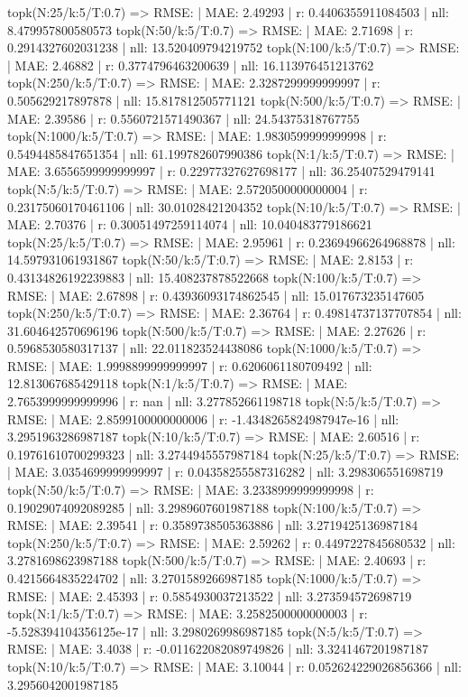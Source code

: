 topk(N:25/k:5/T:0.7) => RMSE: | MAE: 2.49293 | r: 0.4406355911084503 | nll: 8.479957800580573
topk(N:50/k:5/T:0.7) => RMSE: | MAE: 2.71698 | r: 0.2914327602031238 | nll: 13.520409794219752
topk(N:100/k:5/T:0.7) => RMSE: | MAE: 2.46882 | r: 0.3774796463200639 | nll: 16.113976451213762
topk(N:250/k:5/T:0.7) => RMSE: | MAE: 2.3287299999999997 | r: 0.505629217897878 | nll: 15.817812505771121
topk(N:500/k:5/T:0.7) => RMSE: | MAE: 2.39586 | r: 0.5560721571490367 | nll: 24.54375318767755
topk(N:1000/k:5/T:0.7) => RMSE: | MAE: 1.9830599999999998 | r: 0.5494485847651354 | nll: 61.199782607990386
topk(N:1/k:5/T:0.7) => RMSE: | MAE: 3.6556599999999997 | r: 0.22977327627698177 | nll: 36.25407529479141
topk(N:5/k:5/T:0.7) => RMSE: | MAE: 2.5720500000000004 | r: 0.23175060170461106 | nll: 30.01028421204352
topk(N:10/k:5/T:0.7) => RMSE: | MAE: 2.70376 | r: 0.30051497259114074 | nll: 10.040483779186621
topk(N:25/k:5/T:0.7) => RMSE: | MAE: 2.95961 | r: 0.23694966264968878 | nll: 14.597931061931867
topk(N:50/k:5/T:0.7) => RMSE: | MAE: 2.8153 | r: 0.43134826192239883 | nll: 15.408237878522668
topk(N:100/k:5/T:0.7) => RMSE: | MAE: 2.67898 | r: 0.43936093174862545 | nll: 15.017673235147605
topk(N:250/k:5/T:0.7) => RMSE: | MAE: 2.36764 | r: 0.49814737137707854 | nll: 31.604642570696196
topk(N:500/k:5/T:0.7) => RMSE: | MAE: 2.27626 | r: 0.5968530580317137 | nll: 22.011823524438086
topk(N:1000/k:5/T:0.7) => RMSE: | MAE: 1.9998899999999997 | r: 0.6206061180709492 | nll: 12.813067685429118
topk(N:1/k:5/T:0.7) => RMSE: | MAE: 2.7653999999999996 | r: nan | nll: 3.277852661198718
topk(N:5/k:5/T:0.7) => RMSE: | MAE: 2.8599100000000006 | r: -1.4348265824987947e-16 | nll: 3.2951963286987187
topk(N:10/k:5/T:0.7) => RMSE: | MAE: 2.60516 | r: 0.19761610700299323 | nll: 3.2744945557987184
topk(N:25/k:5/T:0.7) => RMSE: | MAE: 3.0354699999999997 | r: 0.04358255587316282 | nll: 3.298306551698719
topk(N:50/k:5/T:0.7) => RMSE: | MAE: 3.2338999999999998 | r: 0.19029074092089285 | nll: 3.2989607601987188
topk(N:100/k:5/T:0.7) => RMSE: | MAE: 2.39541 | r: 0.3589738505363886 | nll: 3.2719425136987184
topk(N:250/k:5/T:0.7) => RMSE: | MAE: 2.59262 | r: 0.4497227845680532 | nll: 3.2781698623987188
topk(N:500/k:5/T:0.7) => RMSE: | MAE: 2.40693 | r: 0.4215664835224702 | nll: 3.2701589266987185
topk(N:1000/k:5/T:0.7) => RMSE: | MAE: 2.45393 | r: 0.5854930037213522 | nll: 3.273594572698719
topk(N:1/k:5/T:0.7) => RMSE: | MAE: 3.2582500000000003 | r: -5.528394104356125e-17 | nll: 3.2980269986987185
topk(N:5/k:5/T:0.7) => RMSE: | MAE: 3.4038 | r: -0.011622082089749826 | nll: 3.3241467201987187
topk(N:10/k:5/T:0.7) => RMSE: | MAE: 3.10044 | r: 0.052624229026856366 | nll: 3.2956042001987185
